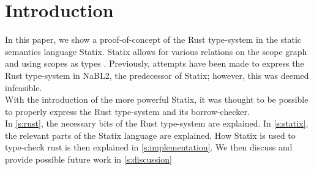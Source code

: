 \section{Introduction}
In this paper, we show a proof-of-concept of the Rust type-system in the static semantics language Statix. Statix allows for various relations on the scope graph and using scopes as types \citep{antwerpen}. Previously, attempts have been made to express the Rust type-system in NaBL2, the predecessor of Statix; however, this was deemed infeasible. \\
With the introduction of the more powerful Statix, it was thought to be possible to properly express the Rust type-system and its borrow-checker.\\
In \autoref{s:rust}, the necessary bits of the Rust type-system are explained. In \autoref{s:statix}, the relevant parts of the Statix language are explained. How Statix is used to type-check rust is then explained in \autoref{s:implementation}. We then discuss and provide possible future work in \autoref{s:discussion} 











